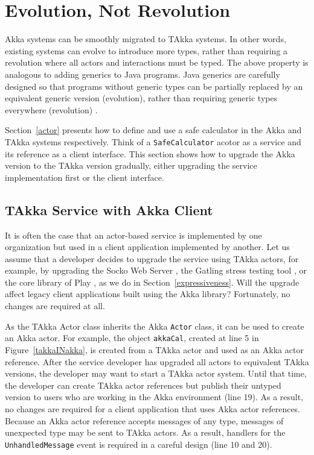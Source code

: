 \section{Evolution, Not Revolution}
\label{evolution}

Akka systems can be smoothly migrated to TAkka systems. In other words, 
existing systems can evolve to introduce more types, rather than requiring a 
revolution where all actors and interactions must be typed.
The above property is analogous to adding generics to Java programs.  Java 
generics are carefully designed so that programs without generic types can be 
partially replaced by an equivalent generic version (evolution), rather than 
requiring generic types everywhere (revolution) \citep{JGC}.

Section~\ref{actor} presents how to define and use a safe calculator
in the Akka and TAkka systems respectively.  Think of a {\tt SafeCalculator} acotor
as a service and its reference as a client interface.  This section shows how to upgrade
the Akka version to the TAkka version gradually, either upgrading the 
service implementation first or the client interface.


\subsection{TAkka Service with Akka Client}

It is often the case that an actor-based service is implemented by one 
organization but used in a client application implemented by another.  
Let us assume that a developer decides to upgrade the service 
using TAkka actors, for example, by upgrading the Socko Web Server 
\citep{SOCKO}, the Gatling stress testing tool \citep{Gatling}, or the core 
library of Play \citep{play_doc}, as we do in Section~\ref{expressiveness}.  
Will the upgrade affect legacy client applications
built using the Akka library?  Fortunately, no changes are required at all.

As the TAkka {Actor} class inherits the Akka {\tt Actor} class, it can be used 
to create an Akka actor.  For example, the object {\tt akkaCal}, created at line 
5 in Figure~\ref{takkaINakka}, is created from a TAkka actor and used as an Akka
actor reference.  After the service developer has upgraded all actors to equivalent 
TAkka versions, the developer may want to start a TAkka actor system.  Until that
time, the developer can create TAkka actor references but publish their untyped
version to users who are working in the Akka environment (line 19).
As a result, no changes are required for a client 
application that uses Akka actor references.  Because an Akka actor reference 
accepts messages of any type, messages of unexpected type may be sent to TAkka actors.  
As a result, handlers for the {\tt UnhandledMessage} event is required in a
careful design (line 10 and 20).



